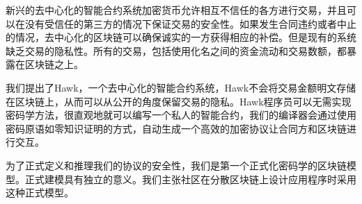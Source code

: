 新兴的去中心化的智能合约系统加密货币允许相互不信任的各方进行交易，并且可以在没有受信任的第三方的情况下保证交易的安全性。如果发生合同违约或者中止的情况，去中心化的区块链可以确保诚实的一方获得相应的补偿。但是现有的系统缺乏交易的隐私性。所有的交易，包括使用化名之间的资金流动和交易数额，都暴露在区块链之上。

我们提出了Hawk，一个去中心化的智能合约系统，Hawk不会将交易金额明文存储在区块链上，从而可以从公开的角度保留交易的隐私。Hawk程序员可以无需实现密码学方法，很直观地就可以编写一个私人的智能合约，我们的编译器会通过使用密码原语如零知识证明的方式，自动生成一个高效的加密协议让合同方和区块链进行交互。

为了正式定义和推理我们的协议的安全性，我们是第一个正式化密码学的区块链模型。正式建模具有独立的意义。我们主张社区在分散区块链上设计应用程序时采用这种正式模型。